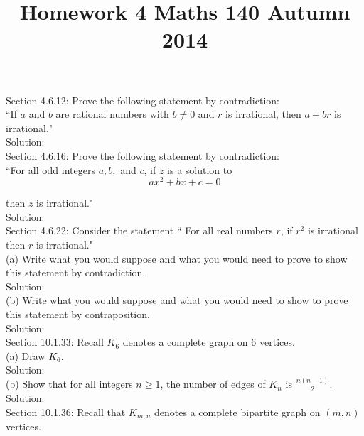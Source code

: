 \documentclass[10 pt]{amsart}
\theoremstyle{definition}
\theoremstyle{remark}
\numberwithin{equation}{subsection}
\begin{document}
\title{Homework 4 Maths 140 Autumn 2014}
\maketitle

Section 4.6.12: Prove the following statement by contradiction:\\

``If $a$ and $b$ are rational numbers with $b\neq 0$ and $r$ is irrational, then $a+br$ is irrational."\\

Solution:\\



Section 4.6.16: Prove the following statement by contradiction:\\

``For all odd integers $a,b,$ and $c$, if $z$ is a solution to \[
ax^2+bx+c=0
\]

then $z$ is irrational."\\

Solution:\\


Section 4.6.22: Consider the statement `` For all real numbers $r$, if $r^2$ is irrational then $r$ is irrational."\\

(a) Write what you would suppose and what you would need to prove to show this statement by contradiction.\\

Solution:\\

(b) Write what you would suppose and what you would need to show to prove this statement by contraposition.\\

Solution:\\

Section 10.1.33: Recall $K_6$ denotes a complete graph on 6 vertices.\\
(a) Draw $K_6$.\\

Solution:\\

(b) Show that for all integers $n\geq 1$, the number of edges 
of $K_n$ is $\frac{n(n-1)}{2}$.\\

Solution:\\




Section 10.1.36: Recall that $K_{m,n}$ denotes a complete bipartite graph on $(m,n)$ vertices.\\
\end{document}
